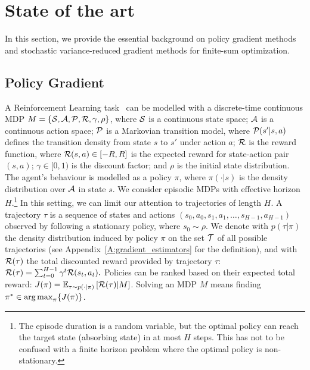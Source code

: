 \chapter{State of the art}\label{chap:art}

\vspace{-0.05in}
In this section, we provide the essential background on policy gradient methods and stochastic variance-reduced gradient methods for finite-sum optimization.
\vspace{-0.05in}

\section{Policy Gradient}\label{sec:PolicyGradient}
\vspace{-0.05in}
A Reinforcement Learning task~\citep{sutton1998reinforcement} can be modelled with a discrete-time continuous \acs{MDP} $M = \{\Sspace,\Aspace,\Transition,\Reward,\gamma,\rho\}$, where $\Sspace$ is a continuous state space; $\Aspace$ is a continuous action space; $\Transition$ is a Markovian transition model, where $\Transition(s'|s,a)$ defines the transition density from state $s$ to $s'$ under action $a$; $\Reward$ is the reward function, where $\Reward(s,a) \in [-R,R]$ is the expected reward for state-action pair $(s,a)$;
$\gamma\in[0,1)$ is the discount factor; and $\rho$ is the initial state distribution.
The agent's behaviour is modelled as a policy $\pi$, where $\pi(\cdot|s)$ is the density distribution over $\Aspace$ in state $s$.
We consider episodic \acs{MDP}s with effective horizon $H$.\footnote{The episode duration is a random variable, but the optimal policy can reach the target state (\ie absorbing state) in at most $H$ steps. This has not to be confused with a finite horizon problem where the optimal policy is non-stationary.} In this setting, we can limit our attention to trajectories of length $H$. A trajectory $\tau$ is a sequence of states and actions $(s_0,a_0,s_1,a_1,\dots,s_{H-1},a_{H-1})$ observed by following a stationary policy, where $s_0 \sim \rho$.
We denote with $p(\tau|\pi)$ the density distribution induced by policy $\pi$ on the set $\Tspace$ of all possible trajectories (see Appendix~\ref{A:gradient_estimators} for the definition), and with $\Reward(\tau)$ the total discounted reward provided by trajectory $\tau$:
%
$\Reward(\tau) = \sum_{t=0}^{H-1}\gamma^t\Reward(s_t,a_t).$
%
Policies can be ranked based on their expected total reward: $J(\pi) = \EVV[\tau \sim p(\cdot|\pi)]{\Reward(\tau)|M}$.
Solving an \acs{MDP} $M$ means finding $\pi^* \in \argmax_{\pi} \{J(\pi)\}$.

